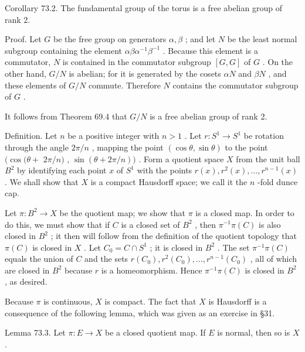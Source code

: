 Corollary 73.2. The fundamental group of the torus is a free abelian group of rank 2.

Proof. Let \(G\) be the free group on generators \(\alpha ,\beta\) ; and let \(N\) be the least normal subgroup containing the element \({\alpha \beta }{\alpha }^{-1}{\beta }^{-1}\) . Because this element is a commutator, \(N\) is contained in the commutator subgroup \(\left\lbrack  {G,G}\right\rbrack\) of \(G\) . On the other hand, \(G/N\) is abelian; for it is generated by the cosets \({\alpha N}\) and \({\beta N}\) , and these elements of \(G/N\) commute. Therefore \(N\) contains the commutator subgroup of \(G\) .

It follows from Theorem 69.4 that \(G/N\) is a free abelian group of rank 2.

Definition. Let \(n\) be a positive integer with \(n > 1\) . Let \(r : {S}^{1} \rightarrow  {S}^{1}\) be rotation through the angle \({2\pi }/n\) , mapping the point \(\left( {\cos \theta ,\sin \theta }\right)\) to the point \((\cos (\theta  +\)  \({2\pi }/n)\) , \(\sin \left( {\theta  + {2\pi }/n}\right) )\) . Form a quotient space \(X\) from the unit ball \({B}^{2}\) by identifying each point \(x\) of \({S}^{1}\) with the points \(r\left( x\right) ,{r}^{2}\left( x\right) ,\ldots ,{r}^{n - 1}\left( x\right)\) . We shall show that \(X\) is a compact Hausdorff space; we call it the \(n\) -fold dunce cap.

Let \(\pi  : {B}^{2} \rightarrow  X\) be the quotient map; we show that \(\pi\) is a closed map. In order to do this, we must show that if \(C\) is a closed set of \({B}^{2}\) , then \({\pi }^{-1}\pi \left( C\right)\) is also closed in \({B}^{2}\) ; it then will follow from the definition of the quotient topology that \(\pi \left( C\right)\) is closed in \(X\) . Let \({C}_{0} = C \cap  {S}^{1}\) ; it is closed in \({B}^{2}\) . The set \({\pi }^{-1}\pi \left( C\right)\) equals the union of \(C\) and the sets \(r\left( {C}_{0}\right) ,{r}^{2}\left( {C}_{0}\right) ,\ldots ,{r}^{n - 1}\left( {C}_{0}\right)\) , all of which are closed in \({B}^{2}\) because \(r\) is a homeomorphism. Hence \({\pi }^{-1}\pi \left( C\right)\) is closed in \({B}^{2}\) , as desired.

Because \(\pi\) is continuous, \(X\) is compact. The fact that \(X\) is Hausdorff is a consequence of the following lemma, which was given as an exercise in  \S 31.

Lemma 73.3. Let \(\pi  : E \rightarrow  X\) be a closed quotient map. If \(E\) is normal, then so is \(X\) .

